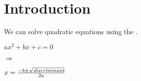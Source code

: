 \section*{Introduction}

We can solve quadratic equations using 
the  .

\hfill
\begin{minipage}{0.3\textwidth}
    \raggedleft
    \Large
    $ax^2 + bx + c = 0$
\end{minipage}
\hfill
{
    \huge $\Rightarrow$
}
\hfill
\begin{minipage}{0.3\textwidth}
    \raggedright
    \Large
    \(
        x = \frac
            {-b \pm \sqrt{\text{\itshape discriminant}}}
            {2a}
    \)
\end{minipage}
\hfill\,

